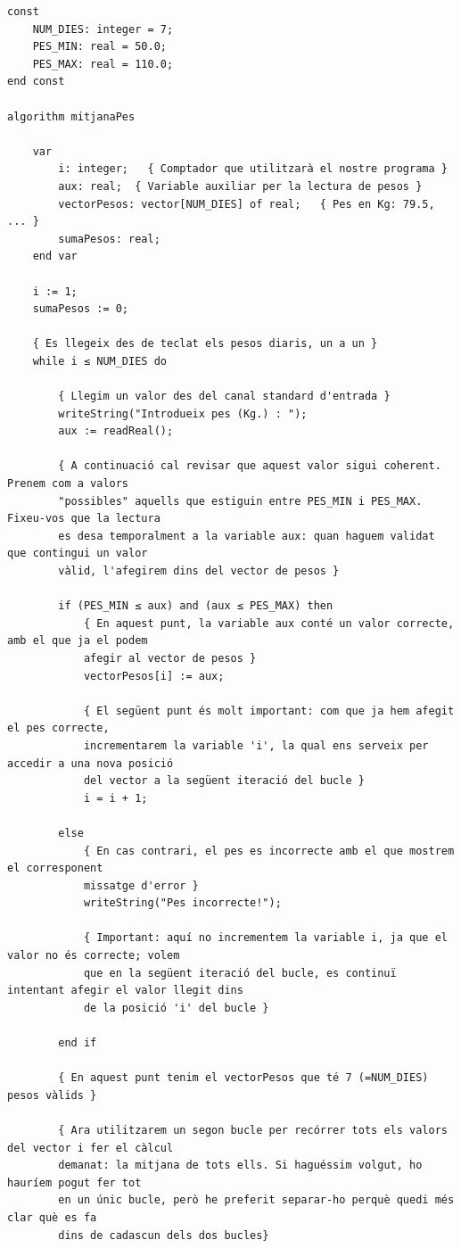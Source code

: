 \documentclass[]{book}
\begin{document}
\begin{verbatim}
const
    NUM_DIES: integer = 7;
    PES_MIN: real = 50.0;
    PES_MAX: real = 110.0;
end const

algorithm mitjanaPes

    var
        i: integer;   { Comptador que utilitzarà el nostre programa }
        aux: real;  { Variable auxiliar per la lectura de pesos }
        vectorPesos: vector[NUM_DIES] of real;   { Pes en Kg: 79.5, ... }
        sumaPesos: real;
    end var

    i := 1;
    sumaPesos := 0;

    { Es llegeix des de teclat els pesos diaris, un a un }
    while i ≤ NUM_DIES do

        { Llegim un valor des del canal standard d'entrada }
        writeString("Introdueix pes (Kg.) : ");
        aux := readReal();

        { A continuació cal revisar que aquest valor sigui coherent. Prenem com a valors
        "possibles" aquells que estiguin entre PES_MIN i PES_MAX. Fixeu-vos que la lectura
        es desa temporalment a la variable aux: quan haguem validat que contingui un valor
        vàlid, l'afegirem dins del vector de pesos }

        if (PES_MIN ≤ aux) and (aux ≤ PES_MAX) then
            { En aquest punt, la variable aux conté un valor correcte, amb el que ja el podem
            afegir al vector de pesos }
            vectorPesos[i] := aux;

            { El següent punt és molt important: com que ja hem afegit el pes correcte,
            incrementarem la variable 'i', la qual ens serveix per accedir a una nova posició
            del vector a la següent iteració del bucle }
            i = i + 1;

        else
            { En cas contrari, el pes es incorrecte amb el que mostrem el corresponent
            missatge d'error }
            writeString("Pes incorrecte!");

            { Important: aquí no incrementem la variable i, ja que el valor no és correcte; volem
            que en la següent iteració del bucle, es continuï intentant afegir el valor llegit dins
            de la posició 'i' del bucle }

        end if

        { En aquest punt tenim el vectorPesos que té 7 (=NUM_DIES) pesos vàlids }

        { Ara utilitzarem un segon bucle per recórrer tots els valors del vector i fer el càlcul
        demanat: la mitjana de tots ells. Si haguéssim volgut, ho hauríem pogut fer tot
        en un únic bucle, però he preferit separar-ho perquè quedi més clar què es fa
        dins de cadascun dels dos bucles}


\end{verbatim}
\end{document}
